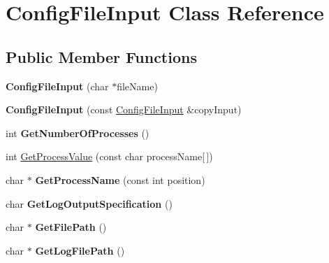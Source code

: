 \hypertarget{class_config_file_input}{\section{Config\-File\-Input Class Reference}
\label{class_config_file_input}
}
\subsection*{Public Member Functions}
\begin{DoxyCompactItemize}
\item 
\hypertarget{class_config_file_input_a5b6ab2074273bc9617fbc31dfa9ec1a9}{{\bfseries Config\-File\-Input} (char $\ast$file\-Name)}\label{class_config_file_input_a5b6ab2074273bc9617fbc31dfa9ec1a9}

\item 
\hypertarget{class_config_file_input_acb6a962a5a02bacadafcb454b866afb6}{{\bfseries Config\-File\-Input} (const \hyperlink{class_config_file_input}{Config\-File\-Input} \&copy\-Input)}\label{class_config_file_input_acb6a962a5a02bacadafcb454b866afb6}

\item 
\hypertarget{class_config_file_input_a58a7e540964501de1cc7c5b1dd46e1e3}{int {\bfseries Get\-Number\-Of\-Processes} ()}\label{class_config_file_input_a58a7e540964501de1cc7c5b1dd46e1e3}

\item 
int \hyperlink{class_config_file_input_acc67c518509dd65e79b0b3781ad14f91}{Get\-Process\-Value} (const char process\-Name\mbox{[}$\,$\mbox{]})
\item 
\hypertarget{class_config_file_input_aedf743487e75ba4a319c10ef6a3a4d6c}{char $\ast$ {\bfseries Get\-Process\-Name} (const int position)}\label{class_config_file_input_aedf743487e75ba4a319c10ef6a3a4d6c}

\item 
\hypertarget{class_config_file_input_ab912e1b4898d643e229c8093113eeeb7}{char {\bfseries Get\-Log\-Output\-Specification} ()}\label{class_config_file_input_ab912e1b4898d643e229c8093113eeeb7}

\item 
\hypertarget{class_config_file_input_aa9d2fba6514a5100922e6bddb4e2aaf5}{char $\ast$ {\bfseries Get\-File\-Path} ()}\label{class_config_file_input_aa9d2fba6514a5100922e6bddb4e2aaf5}

\item 
\hypertarget{class_config_file_input_aed8b12496389a14b9ffe831f9d830e2f}{char $\ast$ {\bfseries Get\-Log\-File\-Path} ()}\label{class_config_file_input_aed8b12496389a14b9ffe831f9d830e2f}

\end{DoxyCompactItemize}
